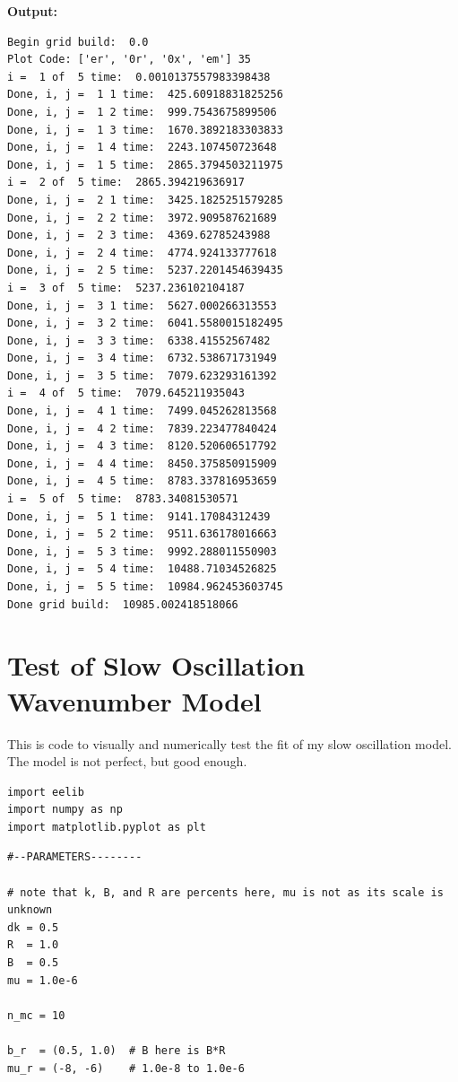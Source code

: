 \documentclass{article}
\begin{document}
\textbf{Output:}\begin{verbatim}
Begin grid build:  0.0
Plot Code: ['er', '0r', '0x', 'em'] 35
i =  1 of  5 time:  0.0010137557983398438
Done, i, j =  1 1 time:  425.60918831825256
Done, i, j =  1 2 time:  999.7543675899506
Done, i, j =  1 3 time:  1670.3892183303833
Done, i, j =  1 4 time:  2243.107450723648
Done, i, j =  1 5 time:  2865.3794503211975
i =  2 of  5 time:  2865.394219636917
Done, i, j =  2 1 time:  3425.1825251579285
Done, i, j =  2 2 time:  3972.909587621689
Done, i, j =  2 3 time:  4369.62785243988
Done, i, j =  2 4 time:  4774.924133777618
Done, i, j =  2 5 time:  5237.2201454639435
i =  3 of  5 time:  5237.236102104187
Done, i, j =  3 1 time:  5627.000266313553
Done, i, j =  3 2 time:  6041.5580015182495
Done, i, j =  3 3 time:  6338.41552567482
Done, i, j =  3 4 time:  6732.538671731949
Done, i, j =  3 5 time:  7079.623293161392
i =  4 of  5 time:  7079.645211935043
Done, i, j =  4 1 time:  7499.045262813568
Done, i, j =  4 2 time:  7839.223477840424
Done, i, j =  4 3 time:  8120.520606517792
Done, i, j =  4 4 time:  8450.375850915909
Done, i, j =  4 5 time:  8783.337816953659
i =  5 of  5 time:  8783.34081530571
Done, i, j =  5 1 time:  9141.17084312439
Done, i, j =  5 2 time:  9511.636178016663
Done, i, j =  5 3 time:  9992.288011550903
Done, i, j =  5 4 time:  10488.71034526825
Done, i, j =  5 5 time:  10984.962453603745
Done grid build:  10985.002418518066

\end{verbatim}

\section{Test of Slow Oscillation Wavenumber Model}

This is code to visually and numerically test the fit of my slow oscillation model. The model is not perfect, but good enough.

\begin{lstlisting}
import eelib
import numpy as np
import matplotlib.pyplot as plt\end{lstlisting}

\begin{lstlisting}
#--PARAMETERS--------

# note that k, B, and R are percents here, mu is not as its scale is unknown
dk = 0.5
R  = 1.0
B  = 0.5
mu = 1.0e-6

n_mc = 10

b_r  = (0.5, 1.0)  # B here is B*R
mu_r = (-8, -6)    # 1.0e-8 to 1.0e-6
\end{lstlisting}
\end{document}
